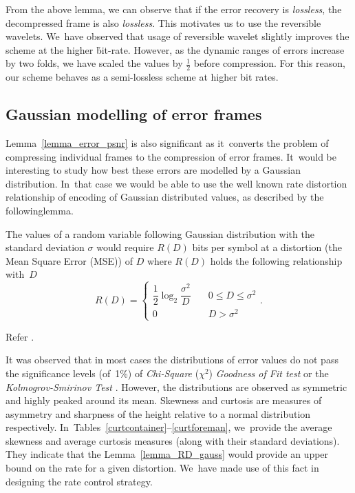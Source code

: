 \documentclass{doublecol-new}
\theoremstyle{TH}{
\newtheorem{lemma}{Lemma}[section]
\newtheorem{theorem}{Theorem}
\newtheorem{corrolary}{Corrolary}
\newtheorem{conjecture}[lemma]{Conjecture}
\newtheorem{proposition}[lemma]{Proposition}
\newtheorem{claim}[lemma]{Claim}
\newtheorem{stheorem}[lemma]{Wrong Theorem}
}
\theoremstyle{THrm}{
\newtheorem{definition}{Definition}[section]
\newtheorem{question}{Question}[section]
\newtheorem{remark}{Remark}[section]
\newtheorem{scheme}{Scheme}
}
\theoremstyle{THhit}{
\newtheorem{case}{Case}[section]
}
\begin{document}
\noindent From the above lemma, we can observe that if the error recovery is
{\it lossless}, the decompressed frame is also {\it lossless}. This motivates us
to use the reversible wavelets. We~have observed that usage of reversible
wavelet slightly improves the scheme at the higher \h{bit-rate}. However, as the
dynamic ranges of errors increase by two folds, we have scaled the values by
$\frac{1}{2}$ before compression. For this reason, our scheme behaves as a
semi-lossless scheme at higher bit rates.

\subsection{Gaussian modelling of error frames}

Lemma~\ref{lemma_error_psnr} is also significant as it~converts the problem of
compressing individual frames to the compression of error frames. It~would be
interesting to study how best these errors are modelled by a Gaussian
distribution. In~that case we would be able to use the well known rate
distortion relationship of encoding of Gaussian distributed values, as described
by the following\break lemma.

\begin{lemma}\label{lemma_RD_gauss}
 The values of a random variable following Gaussian
distribution with the standard
 deviation $\sigma$ would require   $R(D)$ bits per symbol at a distortion
 {\rm (}the
 Mean Square Error {\rm (}MSE{\rm ))} of $D$ where $R(D)$
  holds the following relationship
with~$D$
\begin{equation}
R(D) = \begin{cases}
         \dfrac{1}{2} \log_2 \dfrac{\sigma^2}{D} &\quad 0 \le D \le
                    \sigma^2\\[1pc]
  0  &\quad D > \sigma^2\end{cases}.
\end{equation}
\end{lemma}

 Refer \cite{20}.
\endproof

\noindent
 It was observed that in most cases the distributions
of error values do not  pass the significance levels (of~1\%) of {\it
Chi-Square} ($\chi^2$) {\it Goodness
 of Fit test} \citep{21} or the {\it Kolmogrov-Smirinov Test} \citep{21}.
 However, the distributions are
 observed as symmetric and highly peaked around its mean.
Skewness and curtosis are measures of asymmetry and sharpness of the height
relative to a normal distribution respectively.
In~Tables~\ref{curtcontainer}--\ref{curtforeman}, we~provide the average
skewness and average curtosis measures (along with their standard deviations).
They indicate that the Lemma~\ref{lemma_RD_gauss} would provide an upper bound
on the rate for a given distortion. We~have made use of this fact in designing
the rate control strategy.
\end{document}
